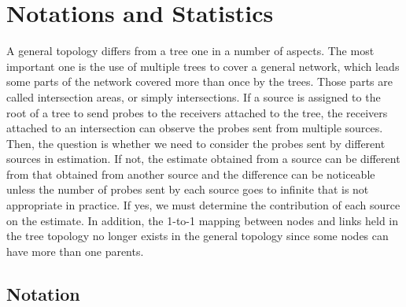 \documentclass[10pt,twocolumn]{IEEEtran}
\begin{document}
\section{Notations and Statistics} \label{section2}
A general topology differs from a tree one in a number of aspects. The
most important one is the use of multiple trees to cover a general
network, which leads some parts of the network covered more than once
by the trees. Those parts are called intersection areas, or simply
intersections. If a source is assigned to the root of a tree to send
probes to the receivers attached to the tree, the receivers attached
to an intersection can observe the probes sent from multiple sources.
Then, the question is whether we need to consider the probes sent by
different sources in estimation. If not, the estimate obtained from a
source can be different from that obtained from another source and the
difference can be noticeable unless the number of probes sent by each
source goes to infinite that is not appropriate in practice. If yes,
we must determine the contribution of each source on the estimate. In
addition, the 1-to-1 mapping between nodes and links held in the tree
topology no longer exists in the general topology since some nodes can
have more than one parents.



\subsection{Notation}\label{treenotation}
\end{document}
